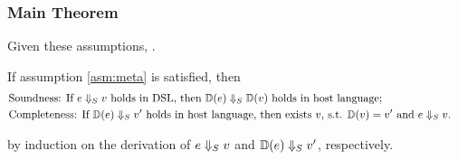 \subsubsection{Main Theorem}

Given these assumptions, .

\begin{theorem}[Correctness]
If assumption \ref{asm:meta} is satisfied, then
\begin{align*}
  & \text{Soundness: If $e \Downarrow_S v$ holds in DSL, then $\mathbb{D}(e)\Downarrow_S \mathbb{D}(v)$ holds in host language;} & \\
  & \text{Completeness: If $\mathbb{D}(e) \Downarrow_S v'$ holds in host language, then exists $v$, s.t. $\mathbb{D}(v)=v'$ and $e\Downarrow_S v$.}
\end{align*}
\end{theorem}

 by induction on the derivation of $e\Downarrow_S v$ and $\mathbb{D}(e)\Downarrow_S v'$, respectively.




